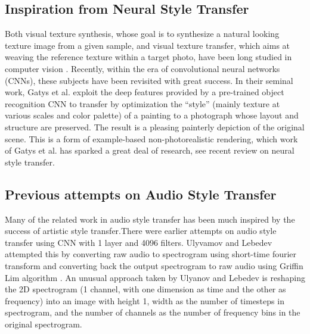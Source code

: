 \documentclass[10pt,twocolumn,letterpaper]{article}
\begin{document}
\subsection{Inspiration from Neural Style Transfer}
Both visual texture synthesis, whose goal is to synthesize a
natural looking texture image from a given sample, and visual
texture transfer, which aims at weaving the reference texture
within a target photo, have been long studied in computer
vision \cite{Authors00002}. Recently, within the era of convolutional neural
networks (CNNs), these subjects have been revisited with
great success. In their seminal work, Gatys et al. \cite{Authors00001} exploit
the deep features provided by a pre-trained object recognition
CNN to transfer by optimization the “style” (mainly texture
at various scales and color palette) of a painting to a photograph
whose layout and structure are preserved. The result is
a pleasing painterly depiction of the original scene. This is
a form of example-based non-photorealistic rendering, which work of Gatys et al. has sparked a great deal of research, see
recent review on neural style transfer.

\subsection{Previous attempts on Audio Style Transfer}
Many of the related work in audio style transfer has been much inspired by the success of artistic style transfer.There were earlier attempts on audio style transfer using
CNN with 1 layer and 4096 filters. Ulyvamov and
Lebedev\cite{Authors00003} attempted this by converting raw audio to spectrogram
using short-time fourier transform and converting
back the output spectrogram to raw audio using Griffin Lim
algorithm \cite{Authors00004}. An unusual approach taken by Ulyanov and
Lebedev is reshaping the 2D spectrogram (1 channel, with one dimension as time and the other as frequency) into an image with height 1, width as the number of timesteps in spectrogram, and the number of channels as the number of frequency bins in the original spectrogram. 
\end{document}

